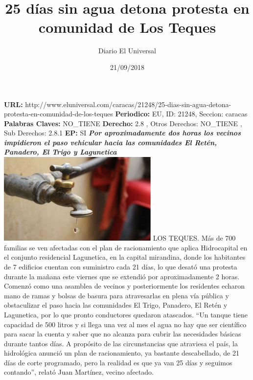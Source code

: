 \documentclass{article}%
\title{\textbf{25 días sin agua detona protesta en comunidad de Los Teques}}%
\author{Diario El Universal}%
\date{21/09/2018}%
\begin{document}
%
\normalsize%
\maketitle%
\textbf{URL: }%
http://www.eluniversal.com/caracas/21248/25{-}dias{-}sin{-}agua{-}detona{-}protesta{-}en{-}comunidad{-}de{-}los{-}teques\newline%
%
\textbf{Periodico: }%
EU, %
ID: %
21248, %
Seccion: %
caracas\newline%
%
\textbf{Palabras Claves: }%
NO\_TIENE\newline%
%
\textbf{Derecho: }%
2.8%
, Otros Derechos: %
NO\_TIENE%
, Sub Derechos: %
2.8.1%
\newline%
%
\textbf{EP: }%
SI\newline%
\newline%
%
\textbf{\textit{Por aproximadamente dos horas los vecinos impidieron el paso vehicular hacia las comunidades El Retén,  Panadero, El Trigo y Lagunetica}}%
\newline%
\newline%
%
\includegraphics[width=300px]{231.jpg}%
\newline%
%
LOS TEQUES.  Más de 700 familias se ven afectadas con el plan de racionamiento que aplica Hidrocapital en el conjunto residencial Lagunetica, en la capital mirandina, donde los habitantes de 7 edificios cuentan con suministro cada 21 días, lo que desató una protesta durante la mañana este viernes que se extendió por aproximadamente 2 horas.%
\newline%
%
Comenzó como una asamblea de vecinos y posteriormente los residentes echaron mano de ramas y bolsas de basura para atravesarlas en plena vía pública y obstaculizar el paso hacia las comunidades El Trigo, Panadero, El Retén y Lagunetica, por lo que pronto conductores quedaron atascados.%
\newline%
%
“Un tanque tiene capacidad de 500 litros y si llega una vez al mes el agua no hay que ser científico para sacar la cuenta y saber que no alcanza para cubrir las necesidades básicas durante tantos días. A propósito de las circunstancias que atraviesa el país, la hidrológica anunció un plan de racionamiento, ya bastante descabellado, de 21 días de corte programado, pero la realidad es que ya van 25 días y seguimos contando”, relató Juan Martínez, vecino afectado.%
\end{document}
